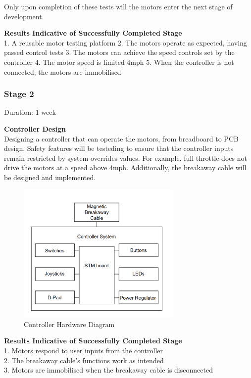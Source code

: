 \documentclass [12pt]{article}
\begin{document}
Only upon completion of these tests will the motors enter the next stage of development.

\textbf{Results Indicative of Successfully Completed Stage}\\
1.	A reusable motor testing platform
2.	The motors operate as expected, having passed control tests
3.	The motors can achieve the speed controls set by the controller
4.	The motor speed is limited 4mph
5.	When the controller is not connected, the motors are immobilised

\subsubsection{Stage 2}

Duration: 1 week

\textbf{Controller Design}\\
Designing a controller that can operate the motors, from breadboard to PCB design. Safety features will be testeding to ensure that the controller inputs remain restricted by system overrides values. For example, full throttle does not drive the motors at a speed above 4mph. Additionally, the breakaway cable will be designed and implemented.

\begin{figure}[h]
    \centering
    \includegraphics[width = 8cm]{MagneticBreakaway.png}
    \caption{Controller Hardware Diagram}
\end{figure}

\textbf{Results Indicative of Successfully Completed Stage}\\
1.	Motors respond to user inputs from the controller\\
2.	The breakaway cable's functions work as intended\\
3.	Motors are immobilised when the breakaway cable is disconnected\\
\end{document}
